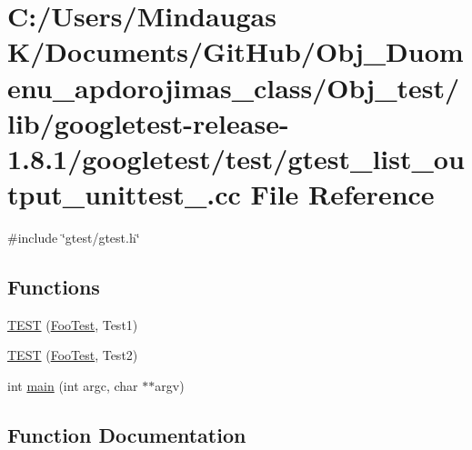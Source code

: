 \hypertarget{_obj__test_2lib_2googletest-release-1_88_81_2googletest_2test_2gtest__list__output__unittest___8cc}{}\section{C\+:/\+Users/\+Mindaugas K/\+Documents/\+Git\+Hub/\+Obj\+\_\+\+Duomenu\+\_\+apdorojimas\+\_\+class/\+Obj\+\_\+test/lib/googletest-\/release-\/1.8.1/googletest/test/gtest\+\_\+list\+\_\+output\+\_\+unittest\+\_\+.cc File Reference}
\label{_obj__test_2lib_2googletest-release-1_88_81_2googletest_2test_2gtest__list__output__unittest___8cc}
{\ttfamily \#include \char`\"{}gtest/gtest.\+h\char`\"{}}\newline
\subsection*{Functions}
\begin{DoxyCompactItemize}
\item 
\mbox{\hyperlink{_obj__test_2lib_2googletest-release-1_88_81_2googletest_2test_2gtest__list__output__unittest___8cc_a0a40c4ec107fc667a7d9e343c956e2ea}{T\+E\+ST}} (\mbox{\hyperlink{class_foo_test}{Foo\+Test}}, Test1)
\item 
\mbox{\hyperlink{_obj__test_2lib_2googletest-release-1_88_81_2googletest_2test_2gtest__list__output__unittest___8cc_a82ffa2009a6d021453fda5b2523eddb7}{T\+E\+ST}} (\mbox{\hyperlink{class_foo_test}{Foo\+Test}}, Test2)
\item 
int \mbox{\hyperlink{_obj__test_2lib_2googletest-release-1_88_81_2googletest_2test_2gtest__list__output__unittest___8cc_a3c04138a5bfe5d72780bb7e82a18e627}{main}} (int argc, char $\ast$$\ast$argv)
\end{DoxyCompactItemize}


\subsection{Function Documentation}
\mbox{\label{_obj__test_2lib_2googletest-release-1_88_81_2googletest_2test_2gtest__list__output__unittest___8cc_a3c04138a5bfe5d72780bb7e82a18e627}} 
